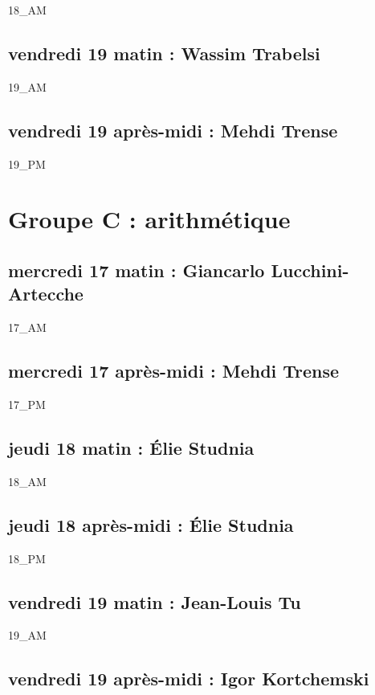 \documentclass[12pt,A4]{book}
\theoremstyle{definition}
\theoremstyle{thm}
\theoremstyle{def}
\begin{document}
{18_AM}

\subsection{vendredi 19 matin : Wassim Trabelsi}

{19_AM}

\subsection{vendredi 19 après-midi : Mehdi Trense}

{19_PM}

\section {Groupe C : arithmétique}

\subsection{mercredi 17 matin : Giancarlo Lucchini-Artecche}

{17_AM}

\subsection{mercredi 17 après-midi : Mehdi Trense}

{17_PM}

\subsection{jeudi 18 matin : Élie Studnia}

{18_AM}

\subsection{jeudi 18 après-midi : Élie Studnia}

{18_PM}

\subsection{vendredi 19 matin : Jean-Louis Tu}

{19_AM}

\subsection{vendredi 19 après-midi : Igor Kortchemski}
\end{document}
